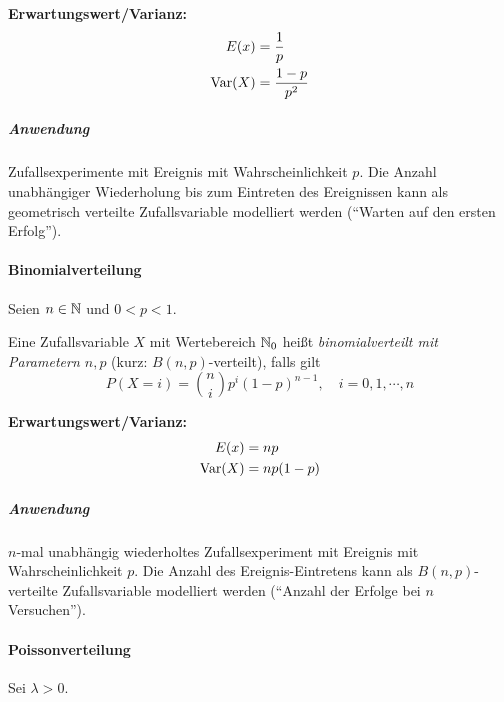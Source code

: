                     \textbf{Erwartungswert/Varianz:}
                    \begin{align*}
                    	E(x)    & = \frac{1}{p}       \\
                    	\operatorname{Var}(X) & = \frac{1 - p}{p^2}
                    \end{align*}
                    
                    \subparagraph{Anwendung}
	                    Zufallsexperimente mit Ereignis mit Wahrscheinlichkeit \(p\). Die Anzahl unabhängiger Wiederholung bis zum Eintreten des Ereignissen kann als geometrisch verteilte Zufallsvariable modelliert werden (\enquote{Warten auf den ersten Erfolg}).

                \paragraph{Binomialverteilung}
                    Seien \( n \in \mathbb{N} \) und \( 0 < p < 1 \).
                    
                    Eine Zufallsvariable \(X\) mit Wertebereich \( \mathbb{N}_0 \) heißt \textit{binomialverteilt mit Parametern \( n, p \)} (kurz: \( B(n, p) \)-verteilt), falls gilt
                    \begin{equation*}
                        P(X = i) = { n \choose i } p^i (1 - p)^{ n - 1 }, \quad i = 0, 1, \cdots, n
                    \end{equation*}
                    
                    \textbf{Erwartungswert/Varianz:}
                    \begin{align*}
                    	E(x)    & = np      \\
                    	\operatorname{Var}(X) & = np(1-p)
                    \end{align*}
                    
                    \subparagraph{Anwendung}
                        \(n\)-mal unabhängig wiederholtes Zufallsexperiment mit Ereignis mit Wahrscheinlichkeit \(p\). Die Anzahl des Ereignis-Eintretens kann als \( B(n, p) \)-verteilte Zufallsvariable modelliert werden (\enquote{Anzahl der Erfolge bei \(n\) Versuchen}).

                \paragraph{Poissonverteilung}
                    Sei \( \lambda > 0 \).
                    
